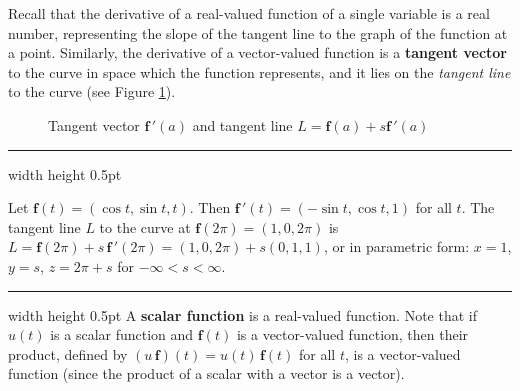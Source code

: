 Recall that the derivative of a real-valued function of a single variable is a real number, representing the slope of
the tangent line to the graph of the function at a point. Similarly, the derivative of a vector-valued function is a
\textbf{tangent vector} to the curve in space which the function represents, and it lies on the
\emph{tangent line} to the curve (see
Figure \ref{fig:vectangent}).\vspace{-4mm}

\begin{figure}[h]
 \begin{center}
  \vspace{-5mm}
 \end{center}
 \caption[]{\quad Tangent vector $\textbf{f}\,'(a)$ and tangent line $L = \textbf{f}(a) + s \textbf{f}\,'(a)$}
 \label{fig:vectangent}
\end{figure}
\hrule width \textwidth height 0.5pt
\begin{exmp}
 Let $\textbf{f}(t) = ( \cos t , \sin t , t )$. Then $\textbf{f}\,'(t) = ( -\sin t , \cos t , 1 )$ for all $t$. The
 tangent line $L$ to the curve at $\textbf{f}(2\pi) = (1,0,2\pi)$ is $L = \textbf{f}(2\pi) + s\,\textbf{f}\,'(2\pi) =
 (1,0,2\pi) + s(0,1,1)$, or in parametric form: $x = 1$, $y = s$, $z = 2\pi + s$ for $-\infty < s < \infty$.
\end{exmp}
\hrule width \textwidth height 0.5pt
\newpage
A \textbf{scalar function} is a real-valued function. Note that if
$u(t)$ is a scalar function and $\textbf{f}(t)$ is a vector-valued function, then their product, defined by
$(u\,\textbf{f})(t) = u(t)\,\textbf{f}(t)$ for all $t$, is a vector-valued function (since the product of a scalar
with a vector is a vector).

